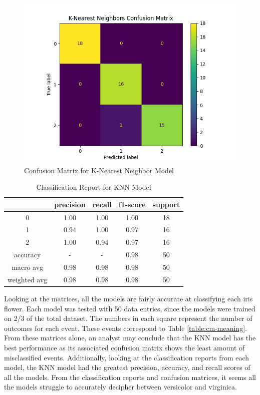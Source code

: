 \documentclass[journal]{IEEEtran}
\begin{document}
\begin{figure}[h!]
\includegraphics[scale=.5]{knn_cm.png}
\centering
\caption{Confusion Matrix for K-Nearest Neighbor Model}
\label{fig:cm-knn}
\end{figure}

\begin{table}[h!]
\centering
\begin{tabular}{ c | c c c c }
& precision   & recall & f1-score  & support \\
\hline
0    &   1.00   &   1.00  &    1.00   &     18\\
1    &   0.94   &   1.00  &    0.97   &     16\\
2    &   1.00   &   0.94  &    0.97   &     16\\
\hline
    accuracy    &   -      &   -      &   0.98    &    50\\
   macro avg    &   0.98   &   0.98   &   0.98    &    50\\
weighted avg    &   0.98   &   0.98   &   0.98    &    50\\
\end{tabular}
\caption{Classification Report for KNN Model}
\label{table:classReport-knn}
\end{table}

\vspace{80px}

Looking at the matrices, all the models are fairly accurate at classifying each iris flower. Each model was tested with 50 data entries, since the models were trained on 2/3 of the total dataset. The numbers in each square represent the number of outcomes for each event. These events correspond to Table \ref{table:cm-meaning}. From these matrices alone, an analyst may conclude that the KNN model has the best performance as its associated confusion matrix shows the least amount of misclassified events. Additionally, looking at the classification reports from each model, the KNN model had the greatest precision, accuracy, and recall scores of all the models. From the classification reports and confusion matrices, it seems all the models struggle to accurately decipher between versicolor and virginica. 
\end{document}
